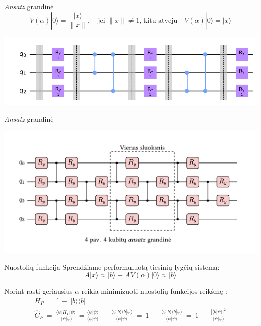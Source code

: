 \begin{frame}{\textit{Ansatz} grandinė}
    $$ V(\alpha)|0\rangle = \frac {|x\rangle }{\|x\|}, \quad\text{jei } \|x\| \ne 1\text{, kitu atveju - } V(\alpha)|0\rangle = |x\rangle$$
    \begin{center}
        \includegraphics[scale=0.6]{img/ansatz.png}
    \end{center}
\end{frame}

\begin{frame}{\textit{Ansatz} grandinė}
    \begin{center}
        \includegraphics[scale=0.7]{img/ansatz4qubits.png}
    \end{center}
\end{frame}
\begin{frame}{Nuostolių funkcija}
    Sprendžiame performuluotą tiesinių lygčių sistemą:
    $$A |x\rangle \approx |b \rangle \equiv AV(\alpha)|0\rangle \approx |b\rangle$$

    Norint rasti geriausius $\alpha$ reikia minimizuoti nuostolių funkcijos reikšmę \cite{VQLS}:
    \begin{gather}
        H_P \ = \ \mathbb{I} \ - \ |b\rangle \langle b| \nonumber \\ 
        \hat{C}_P \ = \ \frac{\langle \psi | H_P | \psi \rangle \ } {\langle\psi|\psi\rangle} = \frac{\langle \psi | \psi \rangle}{\langle \psi | \psi \rangle} \ - \ \frac{\langle \psi |b\rangle \langle b | \psi \rangle}{\langle \psi | \psi \rangle} \ = \ 1 \ - \ \frac{\langle \psi |b\rangle \langle b | \psi \rangle}{\langle \psi | \psi \rangle} \ = \ 1 \ - \ \frac{|\langle b | \psi \rangle|^2}{\langle \psi | \psi \rangle} \nonumber
     \end{gather}
\end{frame}

